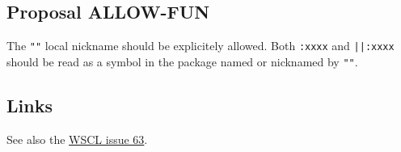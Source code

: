 \documentclass[11pt]{article}
\begin{document}
\subsection{Proposal ALLOW-FUN}
\label{sec:org5b47a46}
The \texttt{""} local nickname should be explicitely allowed. Both \texttt{:xxxx} and \texttt{||:xxxx}
should be read as a symbol in the package named or nicknamed by \texttt{""}.
\subsection{Links}
\label{sec:orgcbb04fc}
See also the \href{https://github.com/s-expressionists/wscl/issues/63}{WSCL issue 63}.
\end{document}
